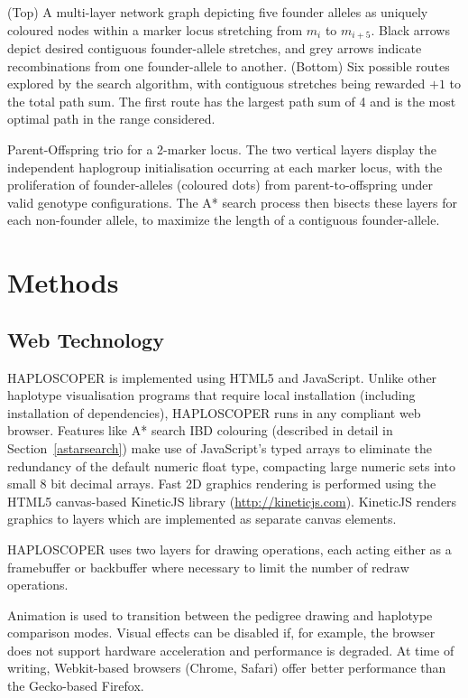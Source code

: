 \documentclass{assets/biotemplate/bioinfo}
\numberwithin{equation}{section}
\def\haplo{{HAPLOSCOPER}}            %
\begin{document}
\begin{methods}

	{(Top) A multi-layer network graph depicting five founder alleles as uniquely coloured nodes within a marker locus stretching from $m_i$ to $m_{i+5}$. Black arrows depict desired contiguous founder-allele stretches, and grey arrows indicate recombinations from one founder-allele to another. (Bottom) Six possible routes explored by the search algorithm, with contiguous stretches being rewarded $+1$ to the total path sum. The first route has the largest path sum of 4 and is the most optimal path in the range considered.}

	{Parent-Offspring trio for a 2-marker locus. The two vertical layers display the independent haplogroup initialisation occurring at each marker locus, with the proliferation of founder-alleles (coloured dots) from parent-to-offspring under valid genotype configurations. The A* search process then bisects these layers for each non-founder allele, to maximize the length of a contiguous founder-allele.}


\section{Methods}

\subsection{Web Technology}

\haplo{} is implemented using HTML5 and JavaScript. Unlike other haplotype visualisation programs that require local installation (including installation of dependencies), \haplo{} runs in any compliant web browser. Features like A* search IBD colouring (described in detail in Section~\ref{astarsearch}) make use of JavaScript's typed arrays to eliminate the redundancy of the default numeric float type, compacting large numeric sets into small 8 bit decimal arrays. Fast 2D graphics rendering is performed using the HTML5 canvas-based {KineticJS library (\url{http://kineticjs.com})}. KineticJS renders graphics to layers which are implemented as separate canvas elements. 

\haplo{} uses two layers for drawing operations, each acting either as a framebuffer or backbuffer where necessary to limit the number of redraw operations.

Animation is used to transition between the pedigree drawing and haplotype comparison modes. Visual effects can be disabled if, for example, the browser does not support hardware acceleration and performance is degraded. At time of writing, Webkit-based browsers (Chrome, Safari) offer better performance than the Gecko-based Firefox.


\end{methods}
\end{document}
